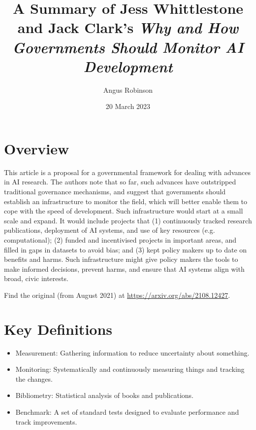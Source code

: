 \documentclass{article}
\title{A Summary of Jess Whittlestone and Jack Clark's \textit{Why and How Governments Should Monitor AI Development}}
\author{Angus Robinson}
\date{20 March 2023}
\begin{document}

\maketitle
\begin{multicols}{2}

\section{Overview}
This article is a proposal for a governmental framework for dealing with advances in AI research. The authors note that so far, such advances have outstripped traditional governance mechanisms, and suggest that governments should establish an infrastructure to monitor the field, which will better enable them to cope with the speed of development. Such infrastructure would start at a small scale and expand. It would include projects that (1) continuously tracked research publications, deployment of AI systems, and use of key resources (e.g. computational); (2) funded and incentivised projects in important areas, and filled in gaps in datasets to avoid bias; and (3) kept policy makers up to date on benefits and harms. Such infrastructure might give policy makers the tools to make informed decisions, prevent harms, and ensure that AI systems align with broad, civic interests. \par Find the original (from August 2021) at \href{https://arxiv.org/abs/2108.12427}{https://arxiv.org/abs/2108.12427}.

\section{Key Definitions}
\begin{itemize}
\item Measurement: Gathering information to reduce uncertainty about something.
\item Monitoring: Systematically and continuously measuring things and tracking the changes.
\item Bibliometry: Statistical analysis of books and publications.
\item Benchmark: A set of standard tests designed to evaluate performance and track improvements.
\end{itemize}


\end{multicols}
\end{document}
